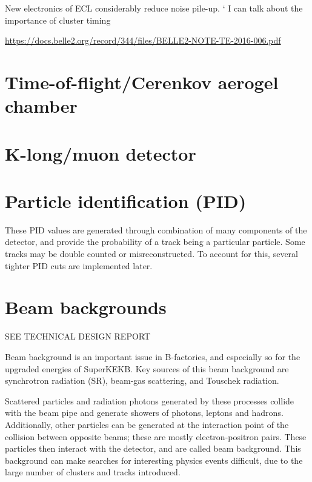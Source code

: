 \documentclass[12pt]{thesis}  %
\begin{document}
New electronics of ECL considerably reduce noise pile-up.
`
I can talk about the importance of cluster timing

\url{https://docs.belle2.org/record/344/files/BELLE2-NOTE-TE-2016-006.pdf}



\section{Time-of-flight/Cerenkov aerogel chamber}


\section{K-long/muon detector}


\section{Particle identification (PID)}

These PID values are generated through combination of many components of the detector, and provide the probability of a track being a particular particle. Some tracks may be double counted or misreconstructed. To account for this, several tighter PID cuts are implemented later.


\section{Beam backgrounds}

SEE TECHNICAL DESIGN REPORT

Beam background is an important issue in B-factories, and especially so for the upgraded energies of SuperKEKB. Key sources of this beam background are synchrotron radiation (SR), beam-gas scattering, and Touschek radiation.

Scattered particles and radiation photons generated by these processes collide with the beam pipe and generate showers of photons, leptons and hadrons. Additionally, other particles can be generated at the interaction point of the collision between opposite beams; these are mostly electron-positron pairs. These particles then interact with the detector, and are called beam background. This background can make searches for interesting physics events difficult, due to the large number of clusters and tracks introduced.
\end{document}
